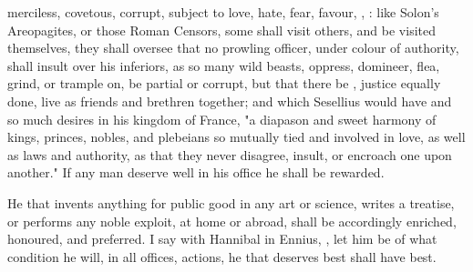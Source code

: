 merciless, covetous, corrupt, subject to love, hate, fear, favour, \etc{},
: like Solon's Areopagites, or those Roman
Censors, some shall visit others, and be visited
 themselves, they shall oversee that no
prowling officer, under colour of authority, shall insult over his inferiors,
as so many wild beasts, oppress, domineer, flea, grind, or trample on, be
partial or corrupt, but that there be , justice equally done,
live as friends and brethren together; and which Sesellius
would have and so much desires in his kingdom of France, "a diapason and sweet
harmony of kings, princes, nobles, and plebeians so mutually tied and involved
in love, as well as laws and authority, as that they never disagree, insult, or
encroach one upon another." If any man deserve well in his office he shall be
rewarded.


He that invents anything for public good in any art or science, writes a
treatise, or performs any noble exploit, at home or abroad,
shall be accordingly enriched,
honoured, and preferred. I say with Hannibal in Ennius,
, let him be of what condition
he will, in all offices, actions, he that deserves best shall have best.

